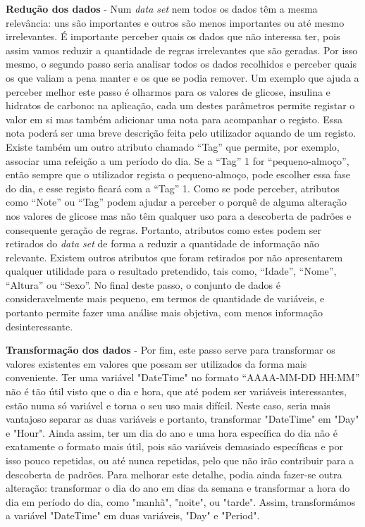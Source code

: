 \textbf{Redução dos dados} - Num \textit{data set} nem todos os dados têm a mesma relevância: uns são importantes e outros são menos importantes ou até mesmo irrelevantes. É importante perceber quais os dados que não interessa ter, pois assim vamos reduzir a quantidade de regras irrelevantes que são geradas. Por isso mesmo, o segundo passo seria analisar todos os dados recolhidos e perceber quais os que valiam a pena manter e os que se podia remover. Um exemplo que ajuda a perceber melhor este passo é olharmos para os valores de glicose, insulina e hidratos de carbono: na aplicação, cada um destes parâmetros permite registar o valor em si mas também adicionar uma nota para acompanhar o registo. Essa nota poderá ser uma breve descrição feita pelo utilizador aquando de um registo. Existe também um outro atributo chamado ``Tag'' que permite, por exemplo, associar uma refeição a um período do dia. Se a ``Tag'' 1 for ``pequeno-almoço'', então sempre que o utilizador regista o pequeno-almoço, pode escolher essa fase do dia, e esse registo ficará com a ``Tag'' 1. Como se pode perceber, atributos como ``Note'' ou ``Tag'' podem ajudar a perceber o porquê de alguma alteração nos valores de glicose mas não têm qualquer uso para a descoberta de padrões e consequente geração de regras. Portanto, atributos como estes podem ser retirados do \textit{data set} de forma a reduzir a quantidade de informação não relevante. Existem outros atributos que foram retirados por não apresentarem qualquer utilidade para o resultado pretendido, tais como, ``Idade'', ``Nome'', ``Altura'' ou ``Sexo''. 
No final deste passo, o conjunto de dados é consideravelmente mais pequeno, em termos de quantidade de variáveis, e portanto permite fazer uma análise mais objetiva, com menos informação desinteressante.

\textbf{Transformação dos dados} - Por fim, este passo serve para transformar os valores existentes em valores que possam ser utilizados da forma mais conveniente. Ter uma variável "DateTime" no formato ``AAAA-MM-DD HH:MM''  não é tão útil visto que o dia e hora, que até podem ser variáveis interessantes, estão numa só variável e torna o seu uso mais difícil. Neste caso, seria mais vantajoso separar as duas variáveis e portanto, transformar "DateTime" em "Day" e "Hour". Ainda assim, ter um dia do ano e uma hora específica do dia não é exatamente o formato mais útil, pois são variáveis demasiado específicas e por isso pouco repetidas, ou até nunca repetidas, pelo que não irão contribuir para a descoberta de padrões. Para melhorar este detalhe, podia ainda fazer-se outra alteração: transformar o dia do ano em dias da semana e transformar a hora do dia em período do dia, como "manhã", "noite", ou "tarde". Assim, transformámos a variável "DateTime" em duas variáveis, "Day" e "Period".


